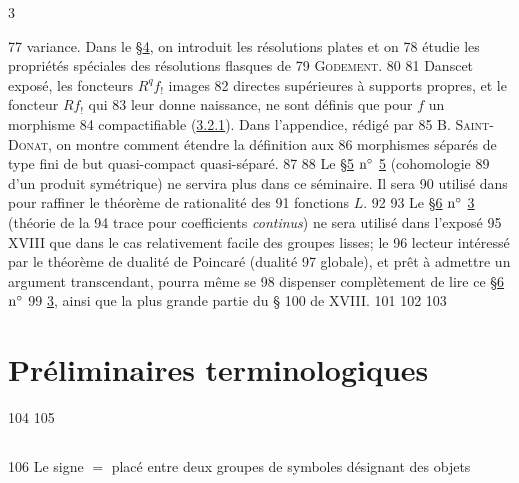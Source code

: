 3	\documentclass[10pt]{../fichiers-configuration-latex/smfart}
\begin{document}
    77	variance. Dans le \S \hyperref[XVII.sec4]{4}, on introduit les résolutions plates et on
    78	étudie les propriétés spéciales des résolutions flasques de
    79	\textsc{Godement}.
    80	
    81	Dans\pageoriginale cet exposé, les foncteurs $R^{q}f_{!}$ images
    82	directes supérieures à supports propres, et le foncteur $Rf_{!}$ qui
    83	leur donne naissance, ne sont définis que pour $f$ un morphisme
    84	compactifiable (\hyperref[XVII.def3.2.1]{3.2.1}). Dans l'appendice, rédigé par
    85	\textsc{B. Saint-Donat}, on montre comment étendre la définition aux
    86	morphismes séparés de type fini de but quasi-compact quasi-séparé.
    87	
    88	Le \S \hyperref[XVII.sec5]{5} ${\rm n^{\circ}}$ \hyperref[XVII.sec5]{5} (cohomologie
    89	d'un produit symétrique) ne servira plus dans ce séminaire. Il sera
    90	utilisé dans  pour raffiner le théorème de rationalité des
    91	fonctions $L$.
    92	
    93	Le \S \hyperref[XVII.sec6]{6} ${\rm n^{\circ}}$ \hyperref[XVII.sec3]{3} (théorie de la
    94	trace pour coefficients \emph{continus}) ne sera utilisé dans l'exposé
    95	XVIII que dans le cas relativement facile des groupes lisses; le
    96	lecteur intéressé par le théorème de dualité de Poincaré (dualité
    97	globale), et prêt à admettre un argument transcendant, pourra même se
    98	dispenser complètement de lire ce \S \hyperref[XVII.sec6]{6} ${\rm n^{\circ}}$
    99	\hyperref[XVII.sec3]{3}, ainsi que la plus grande partie du \S {}
   100	de XVIII.
   101	
   102	\setcounter{section}{-1}
   103	\section{Préliminaires terminologiques}
   104	
   105	\subsection{}
   106	Le signe $=$ placé entre deux groupes de symboles désignant des objets
\end{document}

